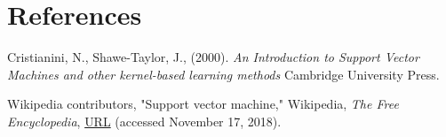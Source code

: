 \documentclass{article}
\begin{document}
\pagebreak
\section{References}

\begin{flushleft}
Cristianini, N., Shawe-Taylor, J., (2000). \textit{An Introduction to Support Vector Machines and other kernel-based learning methods}  Cambridge University Press.
\end{flushleft}

\begin{flushleft}
Wikipedia contributors, "Support vector machine," Wikipedia, \textit{The Free Encyclopedia},  \href{https://en.wikipedia.org/w/index.php?title=Support_vector_machine&oldid=866892968}{URL} (accessed November 17, 2018).
\end{flushleft}
\end{document}
